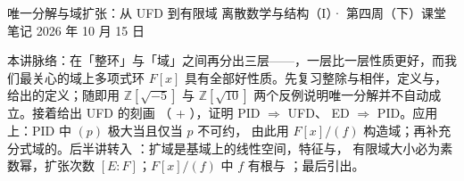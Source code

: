 \documentclass[cjk]{loom}
\newcommand{\Z}{\mathbb{Z}}
\begin{document}
\loomcover
  {唯一分解与域扩张：从 UFD 到有限域}
  {离散数学与结构（I）· 第四周（下）课堂笔记}
  {}
  {2026 年 10 月 15 日}

\begin{strand}
本讲脉络：在「整环」与「域」之间再分出三层——，一层比一层性质更好，而我们最关心的域上多项式环 $F[x]$
具有全部好性质。先复习整除与相伴，定义与，
给出的定义；随即用 $\Z[\sqrt{-5}]$ 与 $\Z[\sqrt{10}]$
两个反例说明唯一分解并不自动成立。接着给出 UFD 的刻画
（ + ），证明 PID $\Rightarrow$ UFD、
ED $\Rightarrow$ PID。应用上：PID 中 $(p)$ 极大当且仅当 $p$ 不可约，
由此用 $F[x]/(f)$ 构造域；再补充分式域的。后半讲转入
：扩域是基域上的线性空间，特征与，
有限域大小必为素数幂，扩张次数 $[E:F]$；$F[x]/(f)$ 中 $f$ 有根与
；最后引出。
\end{strand}

\clearpage
{\small\tableofcontents}

\clearpage






\end{document}
